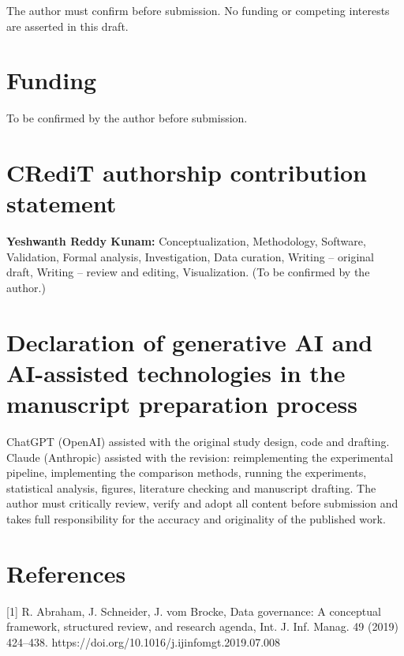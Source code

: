 \documentclass[
  11pt,
]{article}
\begin{document}
The author must confirm before submission. No funding or competing
interests are asserted in this draft.

\hypertarget{funding}{%
\section{Funding}\label{funding}}

To be confirmed by the author before submission.

\hypertarget{credit-authorship-contribution-statement}{%
\section{CRediT authorship contribution
statement}\label{credit-authorship-contribution-statement}}

\textbf{Yeshwanth Reddy Kunam:} Conceptualization, Methodology,
Software, Validation, Formal analysis, Investigation, Data curation,
Writing -- original draft, Writing -- review and editing, Visualization.
(To be confirmed by the author.)

\hypertarget{declaration-of-generative-ai-and-ai-assisted-technologies-in-the-manuscript-preparation-process}{%
\section{Declaration of generative AI and AI-assisted technologies in
the manuscript preparation
process}\label{declaration-of-generative-ai-and-ai-assisted-technologies-in-the-manuscript-preparation-process}}

ChatGPT (OpenAI) assisted with the original study design, code and
drafting. Claude (Anthropic) assisted with the revision: reimplementing
the experimental pipeline, implementing the comparison methods, running
the experiments, statistical analysis, figures, literature checking and
manuscript drafting. The author must critically review, verify and adopt
all content before submission and takes full responsibility for the
accuracy and originality of the published work.

\hypertarget{references}{%
\section*{References}\label{references}}

{[}1{]} R. Abraham, J. Schneider, J. vom Brocke, Data governance: A
conceptual framework, structured review, and research agenda, Int. J.
Inf. Manag. 49 (2019) 424--438.
https://doi.org/10.1016/j.ijinfomgt.2019.07.008
\end{document}

